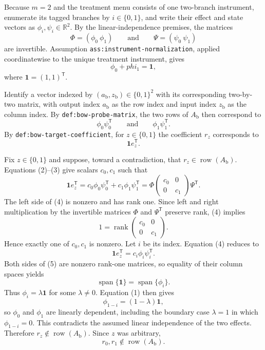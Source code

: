 Because \(m=2\) and the treatment menu consists of one two-branch instrument, enumerate its tagged branches by \(i\in\{0,1\}\), and write their effect and state vectors as \(\phi_i,\psi_i\in\mathbb R^2\).  By the linear-independence premises, the matrices
\[
 \Phi=(\phi_0\ \phi_1)
 \qquad\text{and}\qquad
 \Psi=(\psi_0\ \psi_1)
\]
are invertible.  Assumption \texttt{ass:instrument-normalization}, applied coordinatewise to the unique treatment instrument, gives
\[
 \phi_0+phi_1=\mathbf 1,
 \tag{1}
\]
where \(\mathbf 1=(1,1)^{\mathsf T}\).

Identify a vector indexed by \((a_{\mathrm b},z_{\mathrm b})\in\{0,1\}^2\) with its corresponding two-by-two matrix, with output index \(a_{\mathrm b}\) as the row index and input index \(z_{\mathrm b}\) as the column index.  By \texttt{def:bow-probe-matrix}, the two rows of \(A_{\mathrm b}\) then correspond to
\[
 \phi_0\psi_0^{\mathsf T}
 \qquad\text{and}\qquad
 \phi_1\psi_1^{\mathsf T}.
 \tag{2}
\]
By \texttt{def:bow-target-coefficient}, for \(z\in\{0,1\}\) the coefficient \(r_z\) corresponds to
\[
 \mathbf 1 e_z^{\mathsf T}.
 \tag{3}
\]

Fix \(z\in\{0,1\}\) and suppose, toward a contradiction, that \(r_z\in\operatorname{row}(A_{\mathrm b})\).  Equations (2)--(3) give scalars \(c_0,c_1\) such that
\[
 \mathbf 1e_z^{\mathsf T}
 =c_0\phi_0\psi_0^{\mathsf T}+c_1\phi_1\psi_1^{\mathsf T}
 =\Phi
   \begin{pmatrix}c_0&0\\0&c_1\end{pmatrix}
   \Psi^{\mathsf T}.
 \tag{4}
\]
The left side of (4) is nonzero and has rank one.  Since left and right multiplication by the invertible matrices \(\Phi\) and \(\Psi^{\mathsf T}\) preserve rank, (4) implies
\[
 1=\operatorname{rank}\!\begin{pmatrix}c_0&0\\0&c_1\end{pmatrix}.
\]
Hence exactly one of \(c_0,c_1\) is nonzero.  Let \(i\) be its index.  Equation (4) reduces to
\[
 \mathbf 1e_z^{\mathsf T}=c_i\phi_i\psi_i^{\mathsf T}.
 \tag{5}
\]
Both sides of (5) are nonzero rank-one matrices, so equality of their column spaces yields
\[
 \operatorname{span}\{\mathbf 1\}=\operatorname{span}\{\phi_i\}.
\]
Thus \(\phi_i=\lambda\mathbf 1\) for some \(\lambda\ne0\).  Equation (1) then gives
\[
 \phi_{1-i}=(1-\lambda)\mathbf 1,
\]
so \(\phi_0\) and \(\phi_1\) are linearly dependent, including the boundary case \(\lambda=1\) in which \(\phi_{1-i}=0\).  This contradicts the assumed linear independence of the two effects.  Therefore \(r_z\notin\operatorname{row}(A_{\mathrm b})\).  Since \(z\) was arbitrary,
\[
 r_0,r_1\notin\operatorname{row}(A_{\mathrm b}).
 \tag{6}
\]

